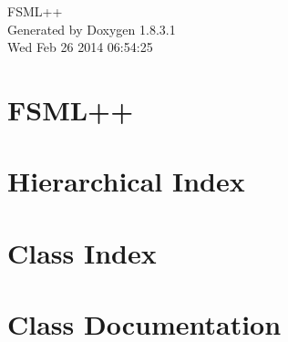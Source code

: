 \documentclass{book}
\begin{document}
\hypersetup{pageanchor=false,citecolor=blue}
\begin{titlepage}
\vspace*{7cm}
\begin{center}
{\Large F\-S\-M\-L++ }\\
\vspace*{1cm}
{\large Generated by Doxygen 1.8.3.1}\\
\vspace*{0.5cm}
{\small Wed Feb 26 2014 06:54:25}\\
\end{center}
\end{titlepage}
\clearemptydoublepage
{}
\tableofcontents
\clearemptydoublepage
{}
\hypersetup{pageanchor=true,citecolor=blue}
\chapter{F\-S\-M\-L++}
\label{md_README}
\hypertarget{md_README}{}

\chapter{Hierarchical Index}

\chapter{Class Index}

\chapter{Class Documentation}


















\printindex
\end{document}
